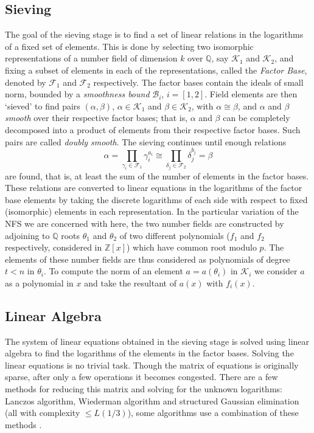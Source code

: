 \documentclass[a4paper, 10pt, envcountsect, runningheads]{article}
\newcommand{\Q}{\mathbb{Q}}
\newcommand{\Z}{\mathbb{Z}}
\numberwithin{figure}{section}
\numberwithin{equation}{section}
\begin{document}
\subsection*{Sieving}
\label{ss:sieving}
The goal of the sieving stage is to find a set of linear relations in the logarithms of a fixed set of elements. This is done by selecting two isomorphic representations of a number field of dimension $k$ over $\Q$, say $\mathcal{K}_{1}$ and $\mathcal{K}_{2}$, and fixing a subset of elements in each of the representations, called the \textit{Factor Base}, denoted by $\mathcal{F}_{1}$ and $\mathcal{F}_{2}$ respectively. The factor bases contain the ideals of small norm, bounded by a {\em smoothness bound} $\mathcal{B}_{i}$, $i=[1,2]$.
Field elements are then `sieved' to find pairs $(\alpha,\beta)$, $\alpha\in\mathcal{K}_{1}$ and $\beta\in\mathcal{K}_{2}$, with $\alpha\cong\beta$, and $\alpha$ and $\beta$ {\em smooth} over their respective factor bases; that is, $\alpha$ and $\beta$ can be completely decomposed into a product of elements from their respective factor bases. Such pairs are called \textit{doubly smooth}. The sieving continues until enough relations $$\alpha=\prod_{\gamma_{i}\in\mathcal{F}_{1}}\gamma_{i}^{a_{i}}\cong\prod_{\delta_{j}\in\mathcal{F}_{2}}\delta_{j}^{b_{j}}=\beta$$ are found, that is, at least the sum of the number of elements in the factor bases.
These relations are converted to linear equations in the logarithms of the factor base elements by taking the discrete logarithms of each side with respect to fixed (isomorphic) elements in each representation.
In the particular variation of the NFS we are concerned with here, the two number fields are constructed by adjoining to $\Q$ roots $\theta_1$ and $\theta_2$ of two different polynomials ($f_1$ and $f_2$ respectively, considered in $\Z[x]$) which have common root modulo $p$. The elements of these number fields are thus considered as polynomials of degree $t<n$ in $\theta_i$. To compute the norm of an element $a=a(\theta_i)$ in $\mathcal{K}_i$ we consider $a$ as a polynomial in $x$ and take the resultant of $a(x)$ with $f_i(x).$
\subsection*{Linear Algebra}
\label{ss:LinAlg}
The system of linear equations obtained in the sieving stage is solved using linear algebra to find the logarithms of the elements in the factor bases.
Solving the linear equations is no trivial task. Though the matrix of equations is originally sparse, after only a few operations it becomes congested. There are a few methods for reducing this matrix and solving for the unknown logarithms: Lanczos algorithm, Wiederman algorithm and structured Gaussian elimination  (all with complexity $\leq L(1/3)$), some algorithms use a combination of these methods \cite{lamacchia-odlyzko}. 
\end{document}
